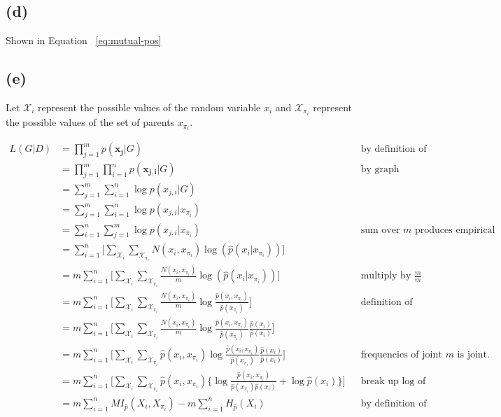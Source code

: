 \documentclass[11pt]{amsart}
\newcommand{\vek}[1]{\mathbf{#1}}
\begin{document}
\subsection{(d)}

Shown in Equation ~\ref{eq:mutual-pos}


\subsection{(e)}

Let $\mathcal{X}_{i}$ represent the possible values of the random variable $x_i$ and $\mathcal{X}_{\pi_{i}}$ represent the possible values of the set of parents $x_{\pi_{i}}$.

\begin{equation}
\begin{aligned}
L(G \vert D) & = \prod_{j=1}^m p(\vek{x_j} \vert G) && \text{by definition of likelihood} \\
		   & = \prod_{j=1}^m \prod_{i=1}^n p(\vek{x_{j,i}} \vert G) && \text{by graph factorization} \\
		   & = \sum_{j=1}^{m}\sum_{i=1}^n \log p(x_{j,i} \vert G) \\
		   & = \sum_{j=1}^{m}\sum_{i=1}^n \log p(x_{j,i} \vert x_{\pi_{i}}) \\
		   & = \sum_{i=1}^{n}\sum_{j=1}^m \log p(x_{j,i} \vert x_{\pi_{i}}) && \text{sum over $m$ produces empirical distribution} \\
		   & = \sum_{i=1}^{n} \bigg[ \sum_{\mathcal{X}_{i}} \sum_{\mathcal{X}_{\pi_i}} N(x_{i}, x_{\pi_i}) \log (\hat{p} (x_{i} \vert x_{\pi_i}))\bigg] \\
		   &=  m \sum_{i=1}^{n} \bigg[ \sum_{\mathcal{X}_{i}} \sum_{\mathcal{X}_{\pi_i}} \frac{N(x_{i}, x_{\pi_i})}{m} \log (\hat{p} (x_{i} \vert x_{\pi_i}))\bigg]  && \text{multiply by $\frac{m}{m}$}\\	
		   &=  m \sum_{i=1}^{n} \bigg[ \sum_{\mathcal{X}_{i}} \sum_{\mathcal{X}_{\pi_i}} \frac{N(x_{i}, x_{\pi_i})}{m} \log \frac{\hat{p} (x_{i}, x_{\pi_i})}{\hat{p}(x_{\pi_i})}\bigg]  && \text{definition of empirircal dist.} \\
		   &=  m \sum_{i=1}^{n} \bigg[ \sum_{\mathcal{X}_{i}} \sum_{\mathcal{X}_{\pi_i}} \frac{N(x_{i}, x_{\pi_i})}{m} \log \frac{\hat{p} (x_{i}, x_{\pi_i})}{\hat{p}(x_{\pi_i})} \frac{\hat{p}(x_{i})}{\hat{p}(x_{i})}\bigg]  && \text{}  \\
		   &=  m \sum_{i=1}^{n} \bigg[ \sum_{\mathcal{X}_{i}} \sum_{\mathcal{X}_{\pi_i}} \hat{p}(x_i, x_{\pi_i}) \log \frac{\hat{p} (x_{i}, x_{\pi_i})}{\hat{p}(x_{\pi_i})} \frac{\hat{p}(x_{i})}{\hat{p}(x_{i})}\bigg]  && \text{frequencies of joint divided by $m$ is joint.}   \\
		   &=  m \sum_{i=1}^{n} \bigg[ \sum_{\mathcal{X}_{i}} \sum_{\mathcal{X}_{\pi_i}} \hat{p}(x_i, x_{\pi_i}) \bigg\{ \log \frac{\hat{p} (x_{i}, x_{\pi_i})}{\hat{p}(x_{\pi_i}) \hat{p}(x_{i})} + \log {\hat{p}(x_{i})} \bigg\} \bigg] && \text{break up log of products} \\
		   &= m \sum_{i=1}^n MI_{\hat{p}}(X_i, X_{\pi_i}) - m \sum_{i=1}^n H_{\hat{p}}(X_i)  && \text{by definition of mutual info. and entropy}
\end{aligned}
\label{eq:graph-likelihood}
\end{equation}
\end{document}
